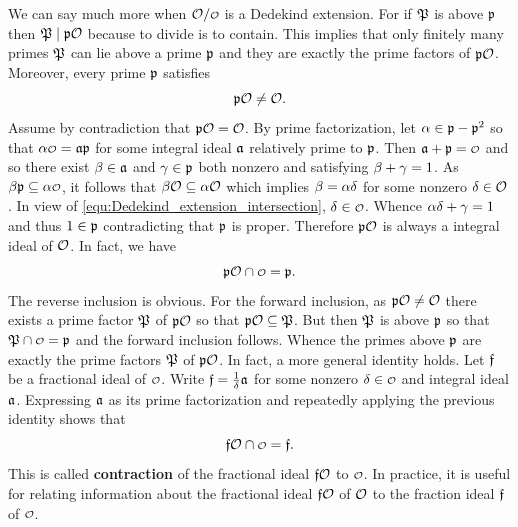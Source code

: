     We can say much more when \(\mc{O}/\smc{O}\) is a Dedekind extension. For if \(\mathfrak{P}\) is above \(\mathfrak{p}\) then \(\mathfrak{P} \mid \mathfrak{p}\mathcal{O}\) because to divide is to contain. This implies that only finitely many primes \(\mathfrak{P}\) can lie above a prime \(\mathfrak{p}\) and they are exactly the prime factors of \(\mathfrak{p}\mathcal{O}\). Moreover, every prime \(\mathfrak{p}\) satisfies
    \[
      \mathfrak{p}\mathcal{O} \neq \mathcal{O}.
    \]
    Assume by contradiction that \(\mathfrak{p}\mathcal{O} = \mathcal{O}\). By prime factorization, let \(\alpha \in \mathfrak{p}-\mathfrak{p}^{2}\) so that \(\a\smc{O} = \mf{a}\mf{p}\) for some integral ideal \(\mathfrak{a}\) relatively prime to \(\mathfrak{p}\). Then \(\mf{a}+\mf{p} = \smc{O}\) and so there exist \(\beta \in \mathfrak{a}\) and \(\gamma \in \mathfrak{p}\) both nonzero and satisfying \(\beta+\gamma = 1\). As \(\b\mf{p} \subseteq \a\smc{O}\), it follows that \(\beta\mathcal{O} \subseteq \alpha\mathcal{O}\) which implies \(\beta = \alpha\delta\) for some nonzero \(\delta \in \mathcal{O}\). In view of \cref{equ:Dedekind_extension_intersection}, \(\d \in \smc{O}\). Whence \(\alpha\delta+\gamma = 1\) and thus \(1 \in \mathfrak{p}\) contradicting that \(\mathfrak{p}\) is proper. Therefore \(\mathfrak{p}\mathcal{O}\) is always a integral ideal of \(\mathcal{O}\). In fact, we have
    \[
      \mf{p}\mc{O} \cap \smc{O} = \mf{p}.
    \]
    The reverse inclusion is obvious. For the forward inclusion, as \(\mathfrak{p}\mathcal{O} \neq \mathcal{O}\) there exists a prime factor \(\mathfrak{P}\) of \(\mathfrak{p}\mathcal{O}\) so that \(\mathfrak{p}\mathcal{O} \subseteq \mathfrak{P}\). But then \(\mathfrak{P}\) is above \(\mathfrak{p}\) so that \(\mf{P} \cap \smc{O} = \mf{p}\) and the forward inclusion follows. Whence the primes above \(\mathfrak{p}\) are exactly the prime factors \(\mathfrak{P}\) of \(\mathfrak{p}\mathcal{O}\). In fact, a more general identity holds. Let \(\mathfrak{f}\) be a fractional ideal of \(\smc{O}\). Write \(\mathfrak{f} = \frac{1}{\delta}\mathfrak{a}\) for some nonzero \(\d \in \smc{O}\) and integral ideal \(\mathfrak{a}\). Expressing \(\mathfrak{a}\) as its prime factorization and repeatedly applying the previous identity shows that
    \[
      \mf{f}\mc{O} \cap \smc{O} = \mf{f}.
    \]
    This is called \textbf{contraction} of the fractional ideal \(\mathfrak{f}\mathcal{O}\) to \(\smc{O}\). In practice, it is useful for relating information about the fractional ideal \(\mathfrak{f}\mathcal{O}\) of \(\mathcal{O}\) to the fraction ideal \(\mathfrak{f}\) of \(\smc{O}\).

